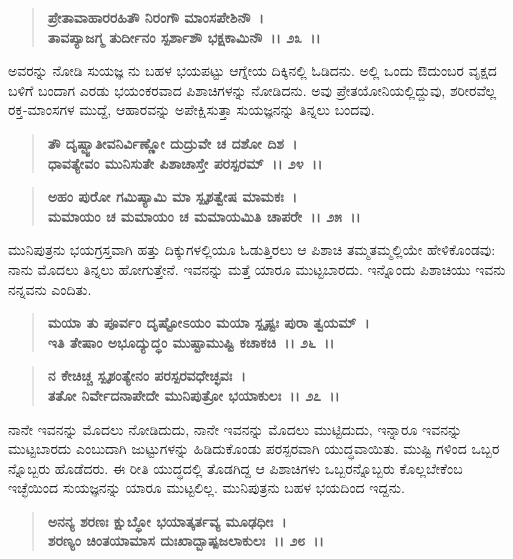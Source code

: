 \begin{verse}
\textbf{ಪ್ರೇತಾವಾಹಾರರಹಿತೌ ನಿರಂಗೌ ಮಾಂಸಪೇಶಿನೌ~।}\\\textbf{ತಾವಪ್ಯಾಜಗ್ಮ ತುರ್ದೀನಂ ಸ್ಪರ್ಶಾಶೌ ಭಕ್ಷಕಾಮಿನೌ~।। ೨೩~।।}
\end{verse}

ಅವರನ್ನು ನೋಡಿ ಸುಯಜ್ಞ ನು ಬಹಳ ಭಯಪಟ್ಟು ಆಗ್ನೇಯ ದಿಕ್ಕಿನಲ್ಲಿ ಓಡಿದನು. ಅಲ್ಲಿ ಒಂದು ಔದುಂಬರ ವೃಕ್ಷದ ಬಳಿಗೆ ಬಂದಾಗ ಎರಡು ಭಯಂಕರವಾದ ಪಿಶಾಚಿಗಳನ್ನು ನೋಡಿದನು. ಅವು ಪ್ರೇತಯೋನಿಯಲ್ಲಿದ್ದುವು, ಶರೀರವೆಲ್ಲ ರಕ್ತ-ಮಾಂಸಗಳ ಮುದ್ದೆ, ಆಹಾರವನ್ನು ಅಪೇಕ್ಷಿಸುತ್ತಾ ಸುಯಜ್ಞನನ್ನು ತಿನ್ನಲು ಬಂದವು.

\begin{verse}
\textbf{ತೌ ದೃಷ್ಟ್ವಾತೀವನಿರ್ವಿಣ್ಣೋ ದುದ್ರುವೇ ಚ ದಶೋ ದಿಶ~।}\\\textbf{ಧಾವತ್ಯೇವಂ ಮುನಿಸುತೇ ಪಿಶಾಚಾಸ್ತೇ ಪರಸ್ಪರಮ್~।। ೨೪~।। }
\end{verse}

\begin{verse}
\textbf{ಅಹಂ ಪುರೋ ಗಮಿಷ್ಯಾಮಿ ಮಾ ಸ್ಪೃಶತ್ವೇಷ ಮಾಮಕಃ~।}\\\textbf{ಮಮಾಯಂ ಚ ಮಮಾಯಂ ಚ ಮಮಾಯಮಿತಿ ಚಾಪರೇ~।। ೨೫~।।}
\end{verse}

ಮುನಿಪುತ್ರನು ಭಯಗ್ರಸ್ತವಾಗಿ ಹತ್ತು ದಿಕ್ಕುಗಳಲ್ಲಿಯೂ ಓಡುತ್ತಿರಲು ಆ ಪಿಶಾಚಿ ತಮ್ಮತಮ್ಮಲ್ಲಿಯೇ ಹೇಳಿಕೊಂಡವು: ನಾನು ಮೊದಲು ತಿನ್ನಲು ಹೋಗುತ್ತೇನೆ. ಇವನನ್ನು ಮತ್ತೆ ಯಾರೂ ಮುಟ್ಟಬಾರದು. ಇನ್ನೊಂದು ಪಿಶಾಚಿಯು ಇವನು ನನ್ನವನು ಎಂದಿತು.

\begin{verse}
\textbf{ಮಯಾ ತು ಪೂರ್ವಂ ದೃಷ್ಟೋಽಯಂ ಮಯಾ ಸ್ಪೃಷ್ಟಃ ಪುರಾ ತ್ವಯಮ್~।}\\\textbf{ಇತಿ ತೇಷಾಂ ಅಭೂದ್ಯುದ್ಧಂ ಮುಷ್ಟಾಮುಷ್ಟಿ ಕಚಾಕಚಿ~।। ೨೬~।।}
\end{verse}

\begin{verse}
\textbf{ನ ಕೇಚಿಚ್ಚ ಸ್ಪೃಶಂತ್ಯೇನಂ ಪರಸ್ಪರವಧೇಚ್ಛವಃ~।}\\\textbf{ತತೋ ನಿರ್ವೇದನಾಪೇದೇ ಮುನಿಪುತ್ರೋ ಭಯಾಕುಲಃ~।। ೨೭~।।}
\end{verse}

ನಾನೇ ಇವನನ್ನು ಮೊದಲು ನೋಡಿದುದು, ನಾನೇ ಇವನನ್ನು ಮೊದಲು ಮುಟ್ಟಿದುದು, ಇನ್ನಾರೂ ಇವನನ್ನು ಮುಟ್ಟಬಾರದು ಎಂಬುದಾಗಿ ಜುಟ್ಟುಗಳನ್ನು ಹಿಡಿದುಕೊಂಡು ಪರಸ್ಪರವಾಗಿ ಯುದ್ಧವಾಯಿತು. ಮುಷ್ಟಿ ಗಳಿಂದ ಒಬ್ಬರ ನ್ನೊಬ್ಬರು ಹೊಡೆದರು. ಈ ರೀತಿ ಯುದ್ಧದಲ್ಲಿ ತೊಡಗಿದ್ದ ಆ ಪಿಶಾಚಿಗಳು ಒಬ್ಬರನ್ನೊಬ್ಬರು ಕೊಲ್ಲಬೇಕೆಂಬ ಇಚ್ಛೆಯಿಂದ ಸುಯಜ್ಞನನ್ನು ಯಾರೂ ಮುಟ್ಟಲಿಲ್ಲ. ಮುನಿಪುತ್ರನು ಬಹಳ ಭಯದಿಂದ ಇದ್ದನು.

\begin{verse}
\textbf{ಅನನ್ಯ ಶರಣಃ ಕ್ಷುಬ್ಧೋ ಭಯಾತ್ಕರ್ತವ್ಯ ಮೂಢಧೀಃ~।}\\\textbf{ಶರಣ್ಯಂ ಚಿಂತಯಾಮಾಸ ದುಃಖಾದ್ಬಾಷ್ಪಜಲಾಕುಲಃ~।। ೨೮~।।}
\end{verse}

